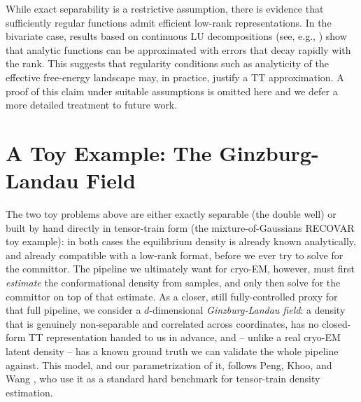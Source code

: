 \documentclass[11pt]{amsart}
\begin{document}
While exact separability is a restrictive assumption, there is evidence that sufficiently regular functions admit efficient low-rank representations. In the bivariate case, results based on continuous LU decompositions (see, e.g., \cite{townsend}) show that analytic functions can be approximated with errors that decay rapidly with the rank. This suggests that regularity conditions such as analyticity of the effective free-energy landscape may, in practice, justify a TT approximation. A proof of this claim under suitable assumptions is omitted here and we defer a more detailed treatment to future work.

\section{A Toy Example: The Ginzburg-Landau Field}\label{sec:gl-example}

The two toy problems above are either exactly separable (the double well) or built by hand directly in tensor-train form (the mixture-of-Gaussians RECOVAR toy example): in both cases the equilibrium density is already known analytically, and already compatible with a low-rank format, before we ever try to solve for the committor. The pipeline we ultimately want for cryo-EM, however, must first \emph{estimate} the conformational density from samples, and only then solve for the committor on top of that estimate. As a closer, still fully-controlled proxy for that full pipeline, we consider a $d$-dimensional \emph{Ginzburg-Landau field}: a density that is genuinely non-separable and correlated across coordinates, has no closed-form TT representation handed to us in advance, and -- unlike a real cryo-EM latent density -- has a known ground truth we can validate the whole pipeline against. This model, and our parametrization of it, follows Peng, Khoo, and Wang \cite{vrs}, who use it as a standard hard benchmark for tensor-train density estimation.
\end{document}
